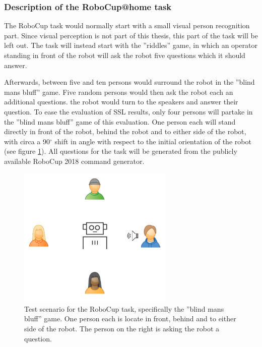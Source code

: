 \subsubsection{Description of the RoboCup@home task}
The RoboCup task would normally start with a small visual person recognition part.
Since visual perception is not part of this thesis, this part of the task will be left out.
The task will instead start with the ''riddles'' game, in which an operator standing in front of the robot will ask the robot five questions which it should answer.

Afterwards, between five and ten persons would surround the robot in the ''blind mans bluff'' game.
Five random persons would then ask the robot each an additional questions.
the robot would turn to the speakers and answer their question.
To ease the evaluation of SSL results, only four persons will partake in the ''blind mans bluff'' game of this evaluation.
One person each will stand directly in front of the robot, behind the robot and to either side of the robot, with circa a 90$^\circ$ shift in angle with respect to the initial orientation of the robot (see figure \ref{pic:eval_task}).
All questions for the task will be generated from the publicly available RoboCup 2018 command generator.



\begin{figure}[]
	\centering
	\includegraphics[width=0.66\textwidth]{diagrams/robocup_task_t1.pdf}
	\caption{Test scenario for the RoboCup task, specifically the ''blind mans bluff'' game. 
		One person each is locate in front, behind and to either side of the robot.
		The person on the right is asking the robot a question.}
	\label{pic:eval_task}
\end{figure}

